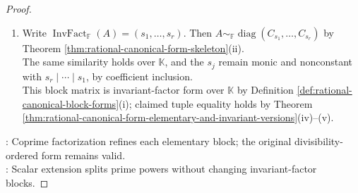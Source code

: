 \begin{theorem}
\begin{proof}
\begin{enumerate}[label=(\roman*)]
Replacing every block defines an elementary-divisor form $R_{\mathbb{K}}$ with $A\sim_{\mathbb{K}}R_{\mathbb{K}}$ by the direct sum of the blockwise similarity matrices.\\
Each block of $R_{\mathbb{K}}$ is cyclic with its displayed order by Definition \ref{def:companion-matrix}, Theorem \ref{thm:companion-matrix-has-prescribed-minimal-polynomial}(i), and Proposition \ref{prop:minimal-polynomial-module-order}(i).\\
Thus the elementary divisors of $R_{\mathbb{K}}$ are its block orders by Proposition \ref{prop:elementary-divisors-direct-sums} and Definition \ref{def:operator-invariant-factors-elementary-divisors}(iii).\\
The asserted multiset is therefore $\operatorname{ElemDiv}_{\mathbb{K}}(A)$ by Theorem \ref{thm:elementary-divisors-complete-similarity-invariant}(ii).
\item Write $\operatorname{InvFact}_{\mathbb{F}}(A)=(s_1,\ldots,s_r)$. Then $A\sim_{\mathbb{F}}\operatorname{diag}(C_{s_1},\ldots,C_{s_r})$ by Theorem \ref{thm:rational-canonical-form-skeleton}(ii).\\
The same similarity holds over $\mathbb{K}$, and the $s_j$ remain monic and nonconstant with $s_r\mid\cdots\mid s_1$, by coefficient inclusion.\\
This block matrix is invariant-factor form over $\mathbb{K}$ by Definition \ref{def:rational-canonical-block-forms}(i); claimed tuple equality holds by Theorem \ref{thm:rational-canonical-form-elementary-and-invariant-versions}(iv)--(v).
\end{enumerate}
: Coprime factorization refines each elementary block; the original divisibility-ordered form remains valid.\\
: Scalar extension splits prime powers without changing invariant-factor blocks.
\end{proof}
\end{theorem}

